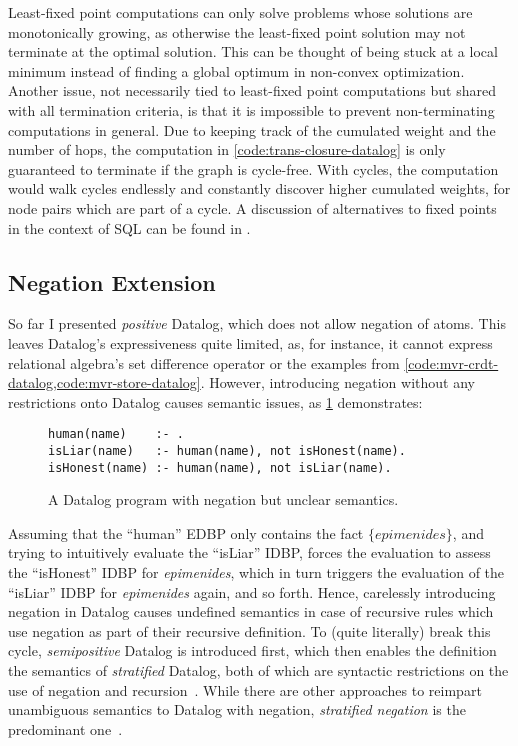Least-fixed point computations can only solve problems whose solutions
are monotonically growing, as otherwise the least-fixed point solution may not
terminate at the optimal solution.
This can be thought of being stuck at a local minimum instead of finding
a global optimum in non-convex optimization.
Another issue, not necessarily tied to least-fixed point computations but shared
with all termination criteria, is that it is impossible to prevent
non-terminating computations in general.
Due to keeping track of the cumulated weight and the number of hops,
the computation in \ref{code:trans-closure-datalog} is only guaranteed to terminate
if the graph is cycle-free.
With cycles, the computation would walk cycles endlessly and constantly discover
higher cumulated weights, for node pairs which are part of a cycle.
A discussion of alternatives to fixed points in the context of SQL
can be found in \cite{hirn2023fix}.

\subsection{Negation Extension}\label{sec:datalog-negation}

So far I presented \emph{positive} Datalog, which does not allow negation of
atoms.
This leaves Datalog's expressiveness quite limited, as, for instance, it cannot
express relational algebra's set difference operator or the examples
from \ref{code:mvr-crdt-datalog,code:mvr-store-datalog}.
However, introducing negation without any restrictions onto Datalog causes
semantic issues, as \ref{code:negative-datalog-issue} demonstrates:

\begin{figure}[htpb]
    \centering
    \begin{lstlisting}[keepspaces]
human(name)    :- .
isLiar(name)   :- human(name), not isHonest(name).
isHonest(name) :- human(name), not isLiar(name).
\end{lstlisting}
    \caption{A Datalog program with negation but unclear semantics.}\label{code:negative-datalog-issue}
\end{figure}

Assuming that the ``human'' \ac{EDBP} only contains the fact
\(\{ \mathit{epimenides} \}\)\footnotemark{}, and trying to intuitively evaluate the
``isLiar'' \ac{IDBP}, forces the evaluation to assess the ``isHonest'' \ac{IDBP}
for \textit{epimenides}, which in turn triggers the evaluation of the
``isLiar'' \ac{IDBP} for \textit{epimenides} again, and so forth.
Hence, carelessly introducing negation in Datalog causes undefined semantics
in case of recursive rules which use negation as part of their recursive definition.
To (quite literally) break this cycle, \emph{semipositive} Datalog is introduced
first, which then enables the definition the semantics of \emph{stratified}
Datalog, both of which are syntactic restrictions on the use of negation and
recursion~\cite{green2013datalog}.
While there are other approaches to reimpart unambiguous semantics to
Datalog with negation, \emph{stratified negation} is the predominant
one~\cite{green2013datalog}.

